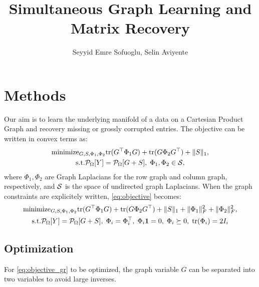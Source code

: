 \documentclass{article}
\title{Simultaneous Graph Learning and Matrix Recovery}
\author{Seyyid Emre Sofuoglu, Selin Aviyente}
\begin{document}
\maketitle

\section{Methods}
Our aim is to learn the underlying manifold of a data on a Cartesian Product Graph and recovery missing or grossly corrupted entries. The objective can be written in convex terms as:
\begin{gather}
    \text{minimize}_{G, S, \Phi_1, \Phi_2}\mathrm{tr}(G^\top \Phi_1 G) + \mathrm{tr}(G \Phi_2 G^\top) + \|S\|_1, \nonumber \\ \text{s.t.} \P_{\Omega}[Y] = \P_{\Omega}[G + S], \; \Phi_1, \Phi_2 \in \S, 
    \label{eq:objective}
\end{gather}
where $\Phi_1, \Phi_2$ are Graph Laplacians for the row graph and column graph, respectively, and $\S$ is the space of undirected graph Laplacians. When the graph constraints are explicitely written, \eqref{eq:objective} becomes:
\begin{gather}
    \text{minimize}_{G, S, \Phi_1, \Phi_2}\mathrm{tr}(G^\top \Phi_1 G) + \mathrm{tr}(G \Phi_2 G^\top) + \|S\|_1 + \|\Phi_1\|_F^2+ \|\Phi_2\|_F^2, \nonumber\\ \text{s.t.} \P_{\Omega}[Y] = \P_{\Omega}[G + S], \; \Phi_i=\Phi_i^\top, \; \Phi_i\mathbf{1} = 0, \; \Phi_i\succeq 0, \; \mathrm{tr}(\Phi_i)=2I_i
    \label{eq:objective_gr}
\end{gather}

\subsection{Optimization}
For \eqref{eq:objective_gr} to be optimized, the graph variable $G$ can be separated into two variables to avoid large inverses. 

% 
% 
\end{document}
